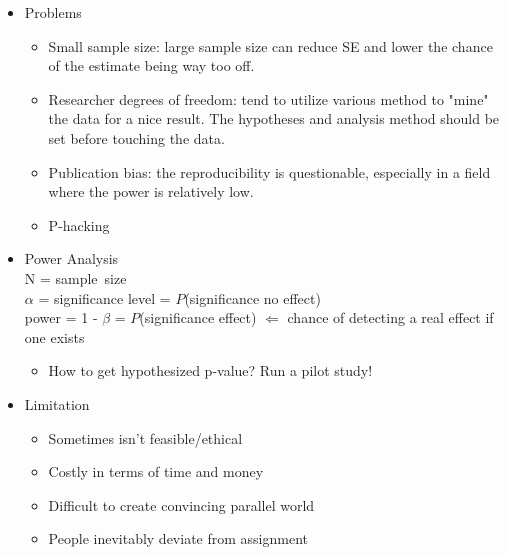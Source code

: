 \begin{itemize}
    \item Problems
    \begin{itemize}
        \item Small sample size: large sample size can reduce SE and lower the chance of the estimate being way too off.
        \item Researcher degrees of freedom: tend to utilize various method to "mine" the data for a nice result. The hypotheses and analysis method should be set before touching the data.
        \item Publication bias: the reproducibility is questionable, especially in a field where the power is relatively low.
        \item P-hacking
    \end{itemize}
\end{itemize}

\begin{itemize}
    \item Power Analysis\\
    N = sample\, size\\
    $\alpha$ = significance level = $P$(significance \textbar no effect)\\
    power = 1 - $\beta$ = $P$(significance \textbar effect) $\Longleftarrow$ chance of detecting a real effect if one exists
    \begin{itemize}
        \item How to get hypothesized p-value? Run a pilot study!
    \end{itemize}  
\end{itemize}

\begin{itemize}
    \item Limitation
    \begin{itemize}
        \item Sometimes isn't feasible/ethical
        \item Costly in terms of time and money
        \item Difficult to create convincing parallel world
        \item People inevitably deviate from assignment
    \end{itemize}
\end{itemize}


